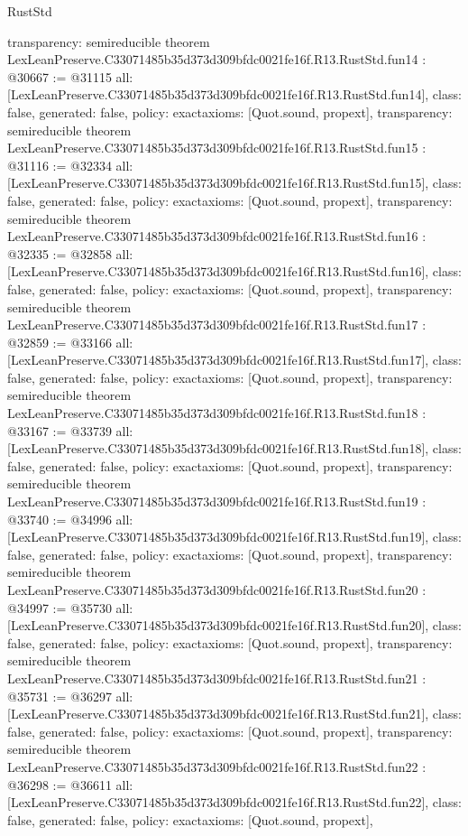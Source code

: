 \begin{lexlean}{RustStd}
\begin{coremodule}
{  transparency: semireducible
}
theorem LexLeanPreserve.C33071485b35d373d309bfdc0021fe16f.R13.RustStd.fun14 : @30667 := @31115 {
  all: [LexLeanPreserve.C33071485b35d373d309bfdc0021fe16f.R13.RustStd.fun14],
  class: false,
  generated: false,
  policy: exact{axioms: [Quot.sound, propext]},
  transparency: semireducible
}
theorem LexLeanPreserve.C33071485b35d373d309bfdc0021fe16f.R13.RustStd.fun15 : @31116 := @32334 {
  all: [LexLeanPreserve.C33071485b35d373d309bfdc0021fe16f.R13.RustStd.fun15],
  class: false,
  generated: false,
  policy: exact{axioms: [Quot.sound, propext]},
  transparency: semireducible
}
theorem LexLeanPreserve.C33071485b35d373d309bfdc0021fe16f.R13.RustStd.fun16 : @32335 := @32858 {
  all: [LexLeanPreserve.C33071485b35d373d309bfdc0021fe16f.R13.RustStd.fun16],
  class: false,
  generated: false,
  policy: exact{axioms: [Quot.sound, propext]},
  transparency: semireducible
}
theorem LexLeanPreserve.C33071485b35d373d309bfdc0021fe16f.R13.RustStd.fun17 : @32859 := @33166 {
  all: [LexLeanPreserve.C33071485b35d373d309bfdc0021fe16f.R13.RustStd.fun17],
  class: false,
  generated: false,
  policy: exact{axioms: [Quot.sound, propext]},
  transparency: semireducible
}
theorem LexLeanPreserve.C33071485b35d373d309bfdc0021fe16f.R13.RustStd.fun18 : @33167 := @33739 {
  all: [LexLeanPreserve.C33071485b35d373d309bfdc0021fe16f.R13.RustStd.fun18],
  class: false,
  generated: false,
  policy: exact{axioms: [Quot.sound, propext]},
  transparency: semireducible
}
theorem LexLeanPreserve.C33071485b35d373d309bfdc0021fe16f.R13.RustStd.fun19 : @33740 := @34996 {
  all: [LexLeanPreserve.C33071485b35d373d309bfdc0021fe16f.R13.RustStd.fun19],
  class: false,
  generated: false,
  policy: exact{axioms: [Quot.sound, propext]},
  transparency: semireducible
}
theorem LexLeanPreserve.C33071485b35d373d309bfdc0021fe16f.R13.RustStd.fun20 : @34997 := @35730 {
  all: [LexLeanPreserve.C33071485b35d373d309bfdc0021fe16f.R13.RustStd.fun20],
  class: false,
  generated: false,
  policy: exact{axioms: [Quot.sound, propext]},
  transparency: semireducible
}
theorem LexLeanPreserve.C33071485b35d373d309bfdc0021fe16f.R13.RustStd.fun21 : @35731 := @36297 {
  all: [LexLeanPreserve.C33071485b35d373d309bfdc0021fe16f.R13.RustStd.fun21],
  class: false,
  generated: false,
  policy: exact{axioms: [Quot.sound, propext]},
  transparency: semireducible
}
theorem LexLeanPreserve.C33071485b35d373d309bfdc0021fe16f.R13.RustStd.fun22 : @36298 := @36611 {
  all: [LexLeanPreserve.C33071485b35d373d309bfdc0021fe16f.R13.RustStd.fun22],
  class: false,
  generated: false,
  policy: exact{axioms: [Quot.sound, propext]},
}
\end{coremodule}
\end{lexlean}
